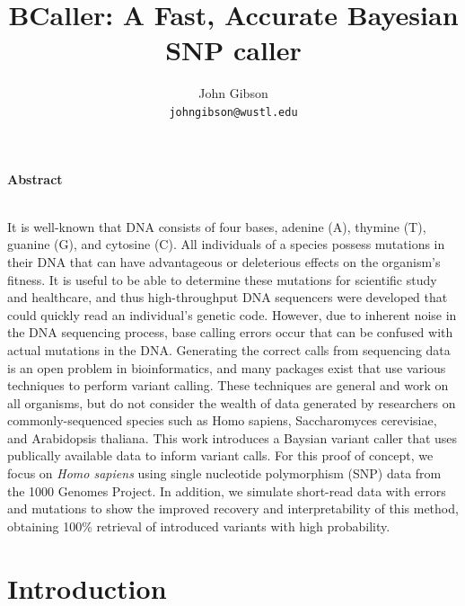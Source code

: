 \documentclass[10pt,letterpaper]{article}
\date{}
\title{BCaller: A Fast, Accurate Bayesian SNP caller}
\author{%
John Gibson\\
{\tt johngibson@wustl.edu}
}
\begin{document}
\maketitle

\begin{center}\textbf{Abstract}\\~\\\parbox{0.667\textwidth}{\em
    
\par It is well-known that DNA consists of four bases, adenine (A), thymine (T), guanine (G), and cytosine (C).
All individuals of a species possess mutations in their DNA that can have advantageous or deleterious effects on the
organism's fitness. It is useful to be able to determine these mutations for scientific study and healthcare,
and thus high-throughput DNA sequencers were developed that could quickly read an individual's genetic code.
However, due to inherent noise in the DNA sequencing process, base calling errors occur that can be confused with actual
mutations in the DNA. Generating the correct calls from sequencing data is an open problem in bioinformatics, and many packages exist that use
various techniques to perform variant calling. These techniques are general and work on all organisms, but do not consider the wealth of
data generated by researchers on commonly-sequenced species such as Homo sapiens, Saccharomyces cerevisiae, and
Arabidopsis thaliana. This work introduces a Baysian variant caller that uses publically
available data to inform variant calls. For this proof of concept, we focus on \textit{Homo sapiens} using single
nucleotide polymorphism (SNP) data from the 1000 Genomes Project. In addition, we simulate short-read data with errors and mutations to show
the improved recovery and interpretability of this method, obtaining 100\% retrieval of introduced variants with high probability.

}\end{center}

\section{Introduction}
\end{document}
